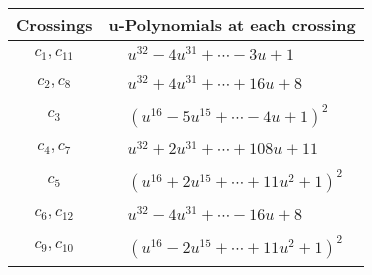 \documentclass[1p]{elsarticle_modified}
\theoremstyle{definition}
\begin{document}
\begin{tabular}{m{50pt}|m{274pt}}
Crossings & \hspace{64pt}u-Polynomials at each crossing \\
\hline $$\begin{aligned}c_{1},c_{11}\end{aligned}$$&$\begin{aligned}
&u^{32}-4 u^{31}+\cdots-3 u+1
\end{aligned}$\\
\hline $$\begin{aligned}c_{2},c_{8}\end{aligned}$$&$\begin{aligned}
&u^{32}+4 u^{31}+\cdots+16 u+8
\end{aligned}$\\
\hline $$\begin{aligned}c_{3}\end{aligned}$$&$\begin{aligned}
&(u^{16}-5 u^{15}+\cdots-4 u+1)^{2}
\end{aligned}$\\
\hline $$\begin{aligned}c_{4},c_{7}\end{aligned}$$&$\begin{aligned}
&u^{32}+2 u^{31}+\cdots+108 u+11
\end{aligned}$\\
\hline $$\begin{aligned}c_{5}\end{aligned}$$&$\begin{aligned}
&(u^{16}+2 u^{15}+\cdots+11 u^2+1)^{2}
\end{aligned}$\\
\hline $$\begin{aligned}c_{6},c_{12}\end{aligned}$$&$\begin{aligned}
&u^{32}-4 u^{31}+\cdots-16 u+8
\end{aligned}$\\
\hline $$\begin{aligned}c_{9},c_{10}\end{aligned}$$&$\begin{aligned}
&(u^{16}-2 u^{15}+\cdots+11 u^2+1)^{2}
\end{aligned}$\\
\hline
\end{tabular}\\~\\
\newpage\renewcommand{\arraystretch}{1}
\end{document}
